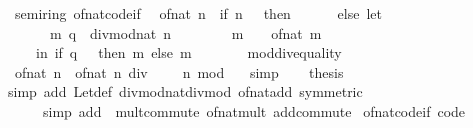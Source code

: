 \begin{isabellebody}
\endisatagproof
{\isafoldproof}%
%
\isadelimproof
\isanewline
%
\endisadelimproof
\isanewline
{}\isamarkupfalse%
\isanewline
\isanewline
{}\isamarkupfalse%
\ {\isacharparenleft}\ semiring{\isacharunderscore}{}{\isacharparenright}\ of{\isacharunderscore}nat{\isacharunderscore}code{\isacharunderscore}if{\isacharcolon}\isanewline
\ \ {\isachardoublequoteopen}of{\isacharunderscore}nat\ n\ {\isacharequal}\ {\isacharparenleft}if\ n\ {\isacharequal}\ {}\ then\ {}\isanewline
\ \ \ \ \ else\ let\isanewline
\ \ \ \ \ \ \ {\isacharparenleft}m{\isacharcomma}\ q{\isacharparenright}\ {\isacharequal}\ divmod{\isacharunderscore}nat\ n\ {}{\isacharsemicolon}\isanewline
\ \ \ \ \ \ \ m{\isacharprime}\ {\isacharequal}\ {}\ {\isacharasterisk}\ of{\isacharunderscore}nat\ m\isanewline
\ \ \ \ \ in\ if\ q\ {\isacharequal}\ {}\ then\ m{\isacharprime}\ else\ m{\isacharprime}\ {\isacharplus}\ {}{\isacharparenright}{\isachardoublequoteclose}\isanewline
%
\isadelimproof
%
\endisadelimproof
%
\isatagproof
{}\isamarkupfalse%
\ {\isacharminus}\isanewline
\ \ \isamarkupfalse%
\ mod{\isacharunderscore}div{\isacharunderscore}equality\ \isamarkupfalse%
\ {\isacharasterisk}{\isacharcolon}\ {\isachardoublequoteopen}of{\isacharunderscore}nat\ n\ {\isacharequal}\ of{\isacharunderscore}nat\ {\isacharparenleft}n\ div\ {}\ {\isacharasterisk}\ {}\ {\isacharplus}\ n\ mod\ {}{\isacharparenright}{\isachardoublequoteclose}\ \isamarkupfalse%
\ simp\isanewline
\ \ \isamarkupfalse%
\ {\isacharquery}thesis\isanewline
\ \ \ \ \isamarkupfalse%
\ {\isacharparenleft}simp\ add{\isacharcolon}\ Let{\isacharunderscore}def\ divmod{\isacharunderscore}nat{\isacharunderscore}div{\isacharunderscore}mod\ of{\isacharunderscore}nat{\isacharunderscore}add\ {\isacharbrackleft}symmetric{\isacharbrackright}{\isacharparenright}\isanewline
\ \ \ \ \ \ {\isacharparenleft}simp\ add{\isacharcolon}\ {\isacharasterisk}\ mult{\isachardot}commute\ of{\isacharunderscore}nat{\isacharunderscore}mult\ add{\isachardot}commute{\isacharparenright}\isanewline
{}\isamarkupfalse%
%
\endisatagproof
{\isafoldproof}%
%
\isadelimproof
\isanewline
%
\endisadelimproof
\isanewline
{}\isamarkupfalse%
\ of{\isacharunderscore}nat{\isacharunderscore}code{\isacharunderscore}if\ {\isacharbrackleft}code{\isacharbrackright}\isanewline
\isanewline
{}\isamarkupfalse%

\end{isabellebody}
